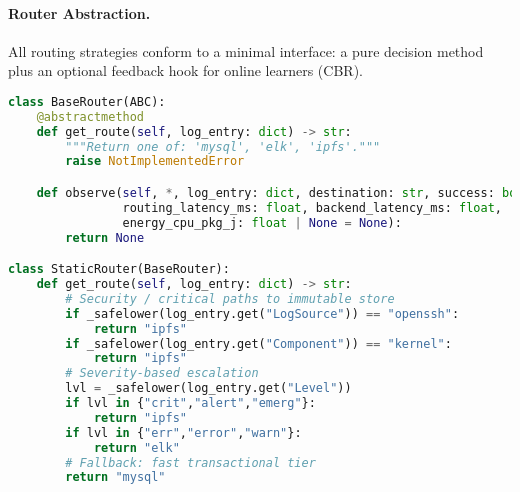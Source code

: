 \paragraph{Router Abstraction.}
All routing strategies conform to a minimal interface: a pure decision method plus an optional feedback hook for online learners (CBR).
\begin{lstlisting}[language=Python,caption={Router interface and Static baseline (excerpt)},label={lst:router-base}]
class BaseRouter(ABC):
    @abstractmethod
    def get_route(self, log_entry: dict) -> str:
        """Return one of: 'mysql', 'elk', 'ipfs'."""
        raise NotImplementedError

    def observe(self, *, log_entry: dict, destination: str, success: bool,
                routing_latency_ms: float, backend_latency_ms: float,
                energy_cpu_pkg_j: float | None = None):
        return None

class StaticRouter(BaseRouter):
    def get_route(self, log_entry: dict) -> str:
        # Security / critical paths to immutable store
        if _safelower(log_entry.get("LogSource")) == "openssh":
            return "ipfs"
        if _safelower(log_entry.get("Component")) == "kernel":
            return "ipfs"
        # Severity-based escalation
        lvl = _safelower(log_entry.get("Level"))
        if lvl in {"crit","alert","emerg"}:
            return "ipfs"
        if lvl in {"err","error","warn"}:
            return "elk"
        # Fallback: fast transactional tier
        return "mysql"
\end{lstlisting}

